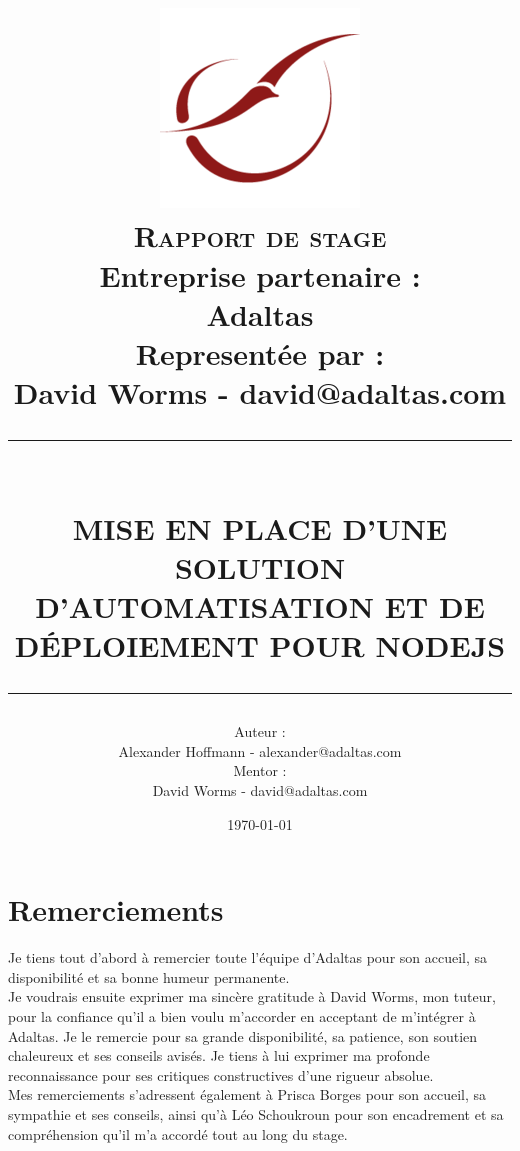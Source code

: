 \documentclass[12pt, french]{report}
\title{	\includegraphics[scale=0.4]{assets/img/logo-adaltas.png}\\[1 cm]
		\normalsize \textsc{Rapport de stage}\\[0.8cm]
		{Entreprise partenaire : \\Adaltas}\\[0.8 cm]
		{Representée par :\\David Worms - david@adaltas.com}\\[0.5 cm]
		\rule{\linewidth}{0.2 mm} \\[0.4 cm]
		\LARGE \textbf{\uppercase{Mise en place d'une solution d'automatisation et de déploiement pour NodeJS}}
		\rule{\linewidth}{0.2 mm}
		}
\author {\normalsize Auteur :\\	\normalsize Alexander Hoffmann - alexander@adaltas.com\\[0.5 cm]
		 \normalsize Mentor :\\	\normalsize David Worms - david@adaltas.com\\}
\date{\normalsize \today}
\begin{document}


\maketitle

\begingroup
\hypersetup{linkcolor=black}
\tableofcontents
\listoffigures
\newpage
\endgroup

\chapter*{Remerciements}

Je tiens tout d’abord à remercier toute l'équipe d'Adaltas pour son accueil, sa disponibilité et sa bonne
humeur permanente.\\

Je voudrais ensuite exprimer ma sincère gratitude à David Worms, mon tuteur, pour la confiance qu’il a bien voulu m’accorder en acceptant de m'intégrer à Adaltas. Je le remercie pour sa grande disponibilité, sa patience, son soutien chaleureux et ses conseils avisés. Je tiens à lui exprimer ma profonde reconnaissance pour ses critiques constructives d’une rigueur absolue.\\

Mes remerciements s’adressent également à Prisca Borges pour son accueil, sa sympathie et ses conseils, ainsi qu'à Léo Schoukroun pour son encadrement et sa compréhension qu'il m'a accordé tout au long du stage.
\end{document}

